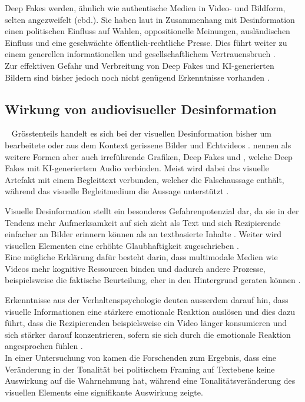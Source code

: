 \documentclass[12pt,a4paper]{article}        %
\begin{document}
\pagebreak
Deep Fakes werden, ähnlich wie authentische Medien in Video- und Bildform, selten angezweifelt (ebd.). Sie haben laut \textcite{pawelec_deepfakes_2022}
in Zusammenhang mit Desinformation einen politischen Einfluss auf Wahlen, oppositionelle Meinungen, ausländischen Einfluss und eine geschwächte öffentlich-rechtliche Presse. Dies führt weiter zu einem generellen informationellen und gesellschaftlichem Vertrauensbruch \parencite[18]{pawelec_deepfakes_2022}.\\
Zur effektiven Gefahr und Verbreitung von Deep Fakes und KI-generierten Bildern sind bisher jedoch noch nicht genügend Erkenntnisse vorhanden \parencite{birrer_what_2024}.

\subsection{Wirkung von audiovisueller Desinformation}
~\label{theory_audiovisual_content}
Grösstenteils handelt es sich bei der visuellen Desinformation bisher um bearbeitete oder aus dem Kontext gerissene Bilder und Echtvideos \parencite[15]{bradshaw_industrialized_2021}. \textcite[3698]{weikmann_visual_2023} nennen als weitere Formen aber auch irreführende Grafiken, Deep Fakes und , welche Deep Fakes mit KI-generiertem Audio verbinden. Meist wird dabei das visuelle Artefakt mit einem Begleittext verbunden, welcher die Falschaussage enthält, während das visuelle Begleitmedium die Aussage unterstützt \parencite[3700]{weikmann_visual_2023}.

Visuelle Desinformation stellt ein besonderes Gefahrenpotenzial dar, da sie in der Tendenz mehr Aufmerksamkeit auf sich zieht als Text \parencites[3701]{weikmann_visual_2023} und sich Rezipierende einfacher an Bilder erinnern können als an textbasierte Inhalte \parencite{grady_neural_1998}. Weiter wird visuellen Elementen eine erhöhte Glaubhaftigkeit zugeschrieben \parencites[3703f]{weikmann_visual_2023}[Messaris \& Abraham, 2001, S. 217, zit.\ nach][641]{dan_visual_2021}[309,312]{sundar_seeing_2021}.\\
Eine mögliche Erklärung dafür besteht darin, dass multimodale Medien wie Videos mehr kognitive Ressourcen binden und dadurch andere Prozesse, beispielsweise die faktische Beurteilung, eher in den Hintergrund geraten können \parencite[303]{sundar_seeing_2021}.

Erkenntnisse aus der Verhaltenspsychologie deuten ausserdem darauf hin, dass visuelle Informationen eine stärkere emotionale Reaktion auslösen \parencite[3703]{weikmann_visual_2023} und dies dazu führt, dass die Rezipierenden beispielsweise ein Video länger konsumieren und sich stärker darauf konzentrieren, sofern sie sich durch die emotionale Reaktion angesprochen fühlen \parencite[146]{teixeira_emotion-induced_2012}.\\
In einer Untersuchung von \textcite{von_sikorski_framing_2019} kamen die Forschenden zum Ergebnis, dass eine Veränderung in der Tonalität bei politischem Framing auf Textebene keine Auswirkung auf die Wahrnehmung hat, während eine Tonalitätsveränderung des visuellen Elements eine signifikante Auswirkung zeigte.
\end{document}
